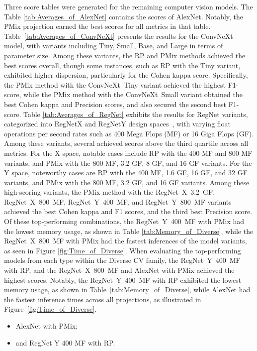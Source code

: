 Three score tables were generated for the remaining computer vision models.
The Table \ref{tab:Averages_of_AlexNet} contains the scores of AlexNet. Notably, the \gls{PMix} projection earned the best scores for all metrics in that table.
Table~\ref{tab:Averages_of_ConvNeXt} presents the results for the ConvNeXt model, with variants including Tiny, Small, Base, and Large in terms of parameter size. Among these variants, the \gls{RP} and \gls{PMix} methods achieved the best scores overall, though some instances, such as \gls{RP} with the Tiny variant, exhibited higher dispersion, particularly for the Cohen kappa score. Specifically, the \gls{PMix} method with the \mbox{ConvNeXt Tiny} variant achieved the highest F1-score, while the \gls{PMix} method with the \mbox{ConvNeXt Small} variant obtained the best Cohen kappa and Precision scores, and also secured the second best F1-score.
Table \ref{tab:Averages_of_RegNet} exhibits the results for RegNet variants, categorized into RegNetX and RegNetY design spaces~\cite{RegNet}, with varying float operations per second rates such as 400 Mega Flops (MF) or 16 Giga Flops (GF). Among these variants, several achieved scores above the third quartile across all metrics. For the X space, notable cases include \gls{RP} with the 400 MF and 800 MF variants, and \gls{PMix} with the 800 MF, 3.2 GF, 8 GF, and 16 GF variants. For the Y space, noteworthy cases are \gls{RP} with the 400 MF, 1.6 GF, 16 GF, and 32 GF variants, and \gls{PMix} with the 800 MF, 3.2 GF, and 16 GF variants. Among these high-scoring variants, the \gls{PMix} method with the \mbox{RegNet X 3.2 GF}, \mbox{RegNet X 800 MF}, \mbox{RegNet Y 400 MF}, and \mbox{RegNet Y 800 MF} variants achieved the best Cohen kappa and F1 scores, and the third best Precision score. Of these top-performing combinations, the \mbox{RegNet Y 400 MF} with \gls{PMix} had the lowest memory usage, as shown in Table \ref{tab:Memory_of_Diverse}, while the \mbox{RegNet X 800 MF} with \gls{PMix} had the fastest inferences of the model variants, as seen in Figure \ref{fig:Time_of_Diverse}.
When evaluating the top-performing models from each type within the Diverse \gls{CV} family, the \mbox{RegNet Y 400 MF} with \gls{RP}, and the \mbox{RegNet X 800 MF} and AlexNet with \gls{PMix} achieved the highest scores. Notably, the \mbox{RegNet Y 400 MF} with \gls{RP} exhibited the lowest memory usage, as shown in Table~\ref{tab:Memory_of_Diverse}, while AlexNet had the fastest inference times across all projections, as illustrated in Figure~\ref{fig:Time_of_Diverse}.  
\begin{itemize}
	\item AlexNet with \gls{PMix};
	\item and RegNet Y 400 MF with \gls{RP}.
\end{itemize}

